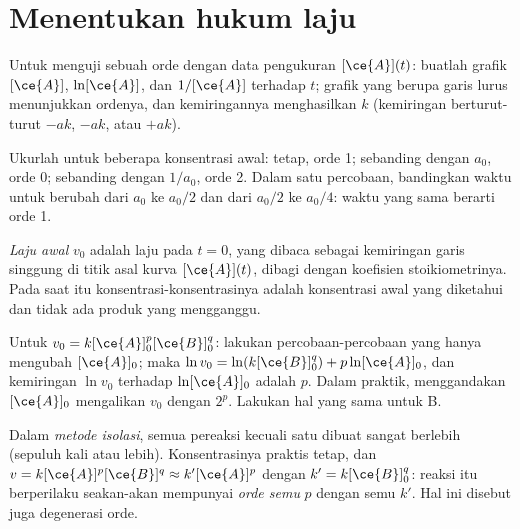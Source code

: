 \section{Menentukan hukum laju}

\begin{method}\label{met:b1:rate-laws:integral}
Untuk menguji sebuah orde dengan data pengukuran $[\ce{A}](t)$: buatlah
grafik $[\ce{A}]$, $\ln[\ce{A}]$, dan $1/[\ce{A}]$ terhadap $t$; grafik
yang berupa garis lurus menunjukkan ordenya, dan kemiringannya
menghasilkan $k$ (kemiringan berturut-turut $-ak$, $-ak$, atau $+ak$).
\end{method}

\begin{method}\label{met:b1:rate-laws:half-life}
Ukurlah  untuk beberapa konsentrasi awal: tetap, orde 1;
sebanding dengan $a_0$, orde 0; sebanding dengan $1/a_0$, orde 2. Dalam
satu percobaan, bandingkan waktu untuk berubah dari $a_0$ ke $a_0/2$ dan
dari $a_0/2$ ke $a_0/4$: waktu yang sama berarti orde 1.
\end{method}

\begin{definition}\label{def:b1:rate-laws:initial-rate}
\emph{Laju awal} $v_0$ adalah laju pada $t = 0$, yang
dibaca sebagai kemiringan garis singgung di titik asal kurva
$[\ce{A}](t)$, dibagi dengan koefisien stoikiometrinya. Pada saat itu
konsentrasi-konsentrasinya adalah konsentrasi awal yang diketahui dan
tidak ada produk yang mengganggu.
\end{definition}

\begin{method}\label{met:b1:rate-laws:initial-rates}
Untuk $v_0 = k[\ce{A}]_0^p[\ce{B}]_0^q$: lakukan percobaan-percobaan yang
hanya mengubah $[\ce{A}]_0$; maka $\ln v_0 = \ln(k[\ce{B}]_0^q) + p\ln[\ce{A}]_0$,
dan kemiringan $\ln v_0$ terhadap $\ln[\ce{A}]_0$ adalah $p$. Dalam
praktik, menggandakan $[\ce{A}]_0$ mengalikan $v_0$ dengan $2^p$. Lakukan
hal yang sama untuk B.
\end{method}

\begin{definition}\label{def:b1:rate-laws:apparent-order}
Dalam \emph{metode isolasi}, semua pereaksi kecuali
satu dibuat sangat berlebih (sepuluh kali atau lebih). Konsentrasinya
praktis tetap, dan $v = k[\ce{A}]^p[\ce{B}]^q \approx k'[\ce{A}]^p$
dengan $k' = k[\ce{B}]_0^q$: reaksi itu berperilaku seakan-akan
mempunyai \emph{orde semu} $p$ dengan  semu $k'$.
Hal ini disebut juga degenerasi orde.
\end{definition}

